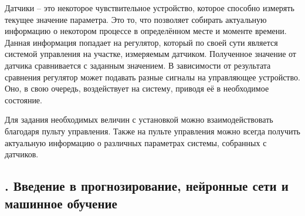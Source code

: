 {  \par \redline Датчики {--} это некоторое чувствительное устройство, которое способно измерять текущее значение параметра. Это то, что позволяет собирать актуальную информацию о некотором процессе в определённом месте и моменте времени. Данная информация попадает на регулятор, который по своей сути является системой управления на участке, измеряемым датчиком. Полученное значение от датчика сравнивается с заданным значением. В зависимости от результата сравнения регулятор может подавать разные сигналы на управляющее устройство. Оно, в свою очередь, воздействует на систему, приводя её в необходимое состояние.

  \par \redline Для задания необходимых величин с установкой можно взаимодействовать благодаря пульту управления. Также на пульте управления можно всегда получить актуальную информацию о различных параметрах системы, собранных с датчиков.

  \par
}

\subtitlespace

\subsection*{
  \gostTitleFont
  \redline
  \thechaptercntr .\thesubchaptercntr \spc
  Введение в прогнозирование, нейронные сети и машинное обучение
} \addtocounter{subchaptercntr}{1}

\subtitlespace

